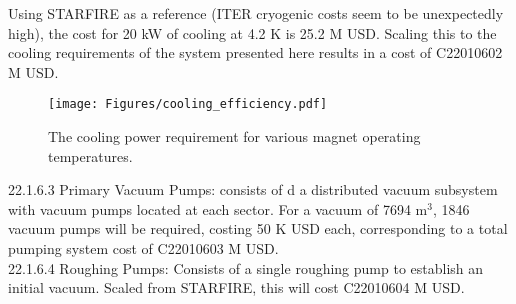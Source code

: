 Using STARFIRE as a reference (ITER cryogenic costs seem to be unexpectedly high), the cost for 20 kW of cooling at 4.2 K is 25.2 M USD. Scaling this to the cooling requirements of the system presented here results in a cost of C22010602 M USD. \\

\begin{figure}[h]
    \centering
    \texttt{[image: Figures/cooling\_efficiency.pdf]}
    \caption{The cooling power requirement for various magnet operating temperatures.}
    \label{fig:cool_eff}
\end{figure}



22.1.6.3 Primary Vacuum Pumps: consists of d a distributed vacuum subsystem with vacuum pumps located at each sector. For a vacuum of 7694 m$^3$, 1846 vacuum pumps will be required, costing 50 K USD each, corresponding to a total pumping system cost of C22010603 M USD.\\

22.1.6.4 Roughing Pumps: Consists of a single roughing pump to establish an initial vacuum. Scaled from STARFIRE, this will cost C22010604 M USD.



